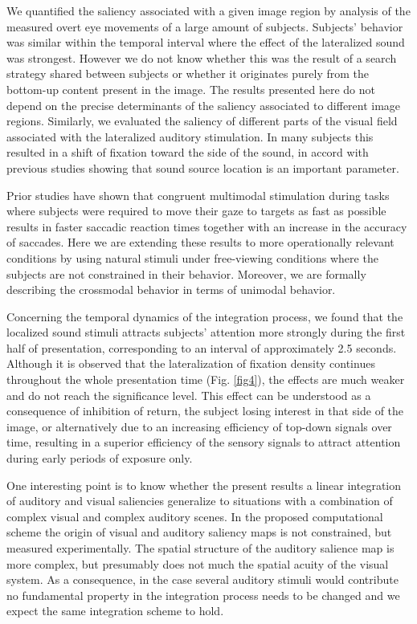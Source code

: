 We quantified the saliency associated with a given image region by analysis
of the measured overt eye movements of a large amount of subjects.
Subjects' behavior was similar within the temporal interval where the
effect of the lateralized sound was strongest. However we do not know
whether this was the result of a search strategy shared between subjects or
whether it originates purely from the bottom-up content present in the
image. The results presented here do not depend on the precise determinants
of the saliency associated to different image regions. Similarly, we
evaluated the saliency of different parts of the visual field associated
with the lateralized auditory stimulation. In many subjects this resulted
in a shift of fixation toward the side of the sound, in accord with
previous studies showing that sound source location is an important
parameter. 

Prior studies \citep{corneil1996a, corneil2002a, arndt2003a} have shown
that congruent multimodal stimulation during tasks where subjects were
required to move their gaze to targets as fast as possible results in
faster saccadic reaction times together with an increase in the accuracy of
saccades. Here we are extending these results to more operationally
relevant conditions by using natural stimuli under free-viewing conditions
where the subjects are not constrained in their behavior. Moreover, we are
formally describing the crossmodal behavior in terms of unimodal behavior. 

Concerning the temporal dynamics of the integration process, we found that
the localized sound stimuli attracts subjects' attention more strongly
during the first half of presentation, corresponding to an interval of
approximately 2.5 seconds. Although it is observed that the lateralization
of fixation density continues throughout the whole presentation time (Fig.
\ref{fig4}), the effects are much weaker and do not reach the significance
level. This effect can be understood as a consequence of inhibition of
return, the subject losing interest in that side of the image, or
alternatively due to an increasing efficiency of top-down signals over
time, resulting in a superior efficiency of the sensory signals to attract
attention during early periods of exposure only. 

One interesting point is to know whether the present results \textemdash a linear
integration of auditory and visual saliencies \textemdash generalize to situations
with a combination of complex visual and complex auditory scenes. In the
proposed computational scheme the origin of visual and auditory saliency
maps is not constrained, but measured experimentally. The spatial structure
of the auditory salience map is more complex, but presumably does not much
the spatial acuity of the visual system. As a consequence, in the case
several auditory stimuli would contribute no fundamental property in the
integration process needs to be changed and we expect the same integration
scheme to hold. 

